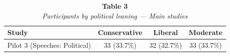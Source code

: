 \begin{table}
\caption*{
{\large \textbf{Table 3}} \\ 
{\small \emph{Participants by political leaning --- Main studies}}
} 
\fontsize{9.0pt}{10.8pt}\selectfont
\begin{tabular*}{\linewidth}{@{\extracolsep{\fill}}lccc}
\toprule
Study & Conservative & Liberal & Moderate \\ 
\midrule\addlinespace[2.5pt]
Pilot 3 (Speeches: Political) & 33 (33.7\%) & 32 (32.7\%) & 33 (33.7\%) \\ 
\bottomrule
\end{tabular*}
\end{table}

